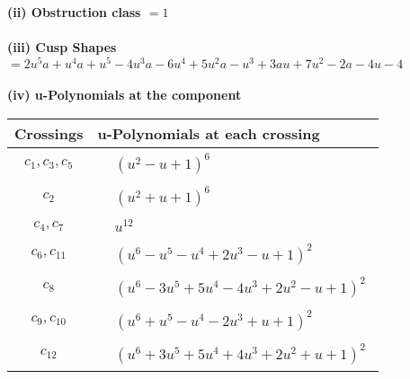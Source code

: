 \documentclass[1p]{elsarticle_modified}
\theoremstyle{definition}
\begin{document}
\flushleft \textbf{(ii) Obstruction class $= 1$}\\~\\
\flushleft \textbf{(iii) Cusp Shapes $= 2 u^5 a+u^4 a+u^5-4 u^3 a-6 u^4+5 u^2 a- u^3+3 a u+7 u^2-2 a-4 u-4$}\\~\\
\newpage\renewcommand{\arraystretch}{1}
\flushleft \textbf{(iv) u-Polynomials at the component}\newline \\
\begin{tabular}{m{50pt}|m{274pt}}
Crossings & \hspace{64pt}u-Polynomials at each crossing \\
\hline $$\begin{aligned}c_{1},c_{3},c_{5}\end{aligned}$$&$\begin{aligned}
&(u^2- u+1)^6
\end{aligned}$\\
\hline $$\begin{aligned}c_{2}\end{aligned}$$&$\begin{aligned}
&(u^2+u+1)^6
\end{aligned}$\\
\hline $$\begin{aligned}c_{4},c_{7}\end{aligned}$$&$\begin{aligned}
&u^{12}
\end{aligned}$\\
\hline $$\begin{aligned}c_{6},c_{11}\end{aligned}$$&$\begin{aligned}
&(u^6- u^5- u^4+2 u^3- u+1)^2
\end{aligned}$\\
\hline $$\begin{aligned}c_{8}\end{aligned}$$&$\begin{aligned}
&(u^6-3 u^5+5 u^4-4 u^3+2 u^2- u+1)^2
\end{aligned}$\\
\hline $$\begin{aligned}c_{9},c_{10}\end{aligned}$$&$\begin{aligned}
&(u^6+u^5- u^4-2 u^3+u+1)^2
\end{aligned}$\\
\hline $$\begin{aligned}c_{12}\end{aligned}$$&$\begin{aligned}
&(u^6+3 u^5+5 u^4+4 u^3+2 u^2+u+1)^2
\end{aligned}$\\
\hline
\end{tabular}\\~\\
\end{document}
